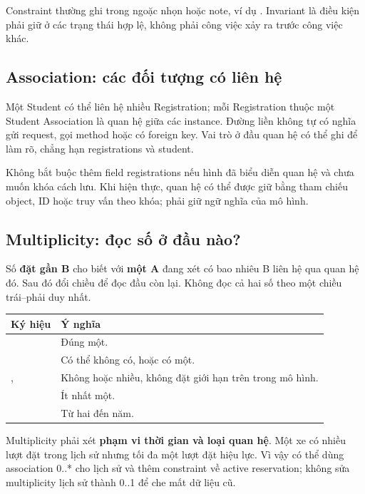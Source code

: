 Constraint thường ghi trong ngoặc nhọn hoặc note, ví dụ . Invariant là điều kiện phải giữ ở các trạng thái hợp lệ, không phải công việc xảy ra trước công việc khác.

\subsection{Association: các đối tượng có liên hệ}
  {Một Student có thể liên hệ nhiều Registration; mỗi Registration thuộc một Student}
Association là quan hệ giữa các instance. Đường liền không tự có nghĩa gửi request, gọi method hoặc có foreign key. Vai trò ở đầu quan hệ có thể ghi để làm rõ, chẳng hạn registrations và student.

Không bắt buộc thêm field registrations nếu hình đã biểu diễn quan hệ và chưa muốn khóa cách lưu. Khi hiện thực, quan hệ có thể được giữ bằng tham chiếu object, ID hoặc truy vấn theo khóa; phải giữ ngữ nghĩa của mô hình.

\subsection{Multiplicity: đọc số ở đầu nào?}
Số \textbf{đặt gần B} cho biết với \textbf{một A} đang xét có bao nhiêu B liên hệ qua quan hệ đó. Sau đó đổi chiều để đọc đầu còn lại. Không đọc cả hai số theo một chiều trái--phải duy nhất.

\begin{center}\begin{tabularx}{\linewidth}{|L{22mm}|Y|}\hline
\textbf{Ký hiệu} & \textbf{Ý nghĩa}\\\hline
{} & Đúng một.\\\hline
{} & Có thể không có, hoặc có một.\\\hline
{}, \code{*} & Không hoặc nhiều, không đặt giới hạn trên trong mô hình.\\\hline
{} & Ít nhất một.\\\hline
{} & Từ hai đến năm.\\\hline
\end{tabularx}\end{center}
Multiplicity phải xét \textbf{phạm vi thời gian và loại quan hệ}. Một xe có nhiều lượt đặt trong lịch sử nhưng tối đa một lượt đặt hiệu lực. Vì vậy có thể dùng association 0..* cho lịch sử và thêm constraint về active reservation; không sửa multiplicity lịch sử thành 0..1 để che mất dữ liệu cũ.

